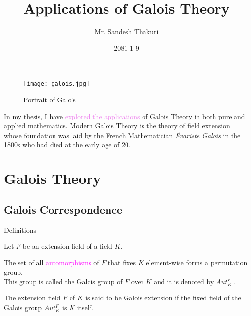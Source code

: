 \documentclass{beamer}
\title{Applications of Galois Theory}
\author[Sandesh Thakuri]{Mr. Sandesh Thakuri}
\institute[CDM, TU]
{Central Department of Mathematics, TU}
\date{2081-1-9}
\begin{document}
\myfootline

\begin{frame}[plain]
  \tikzonlytitlepage
  \titlepage
\end{frame}

\begin{frame}[plain]
\begin{figure}[h!]
  \centering
  \texttt{[image: galois.jpg]}
  \caption{\footnotesize Portrait of Galois}
\end{figure}

In my thesis, I have \textcolor{violet}{explored the applications} of Galois Theory in both pure and applied mathematics. Modern Galois Theory is the theory of field extension whose \textcolor{green!50!black}{foundation was laid by the French Mathematician \textit{Évariste Galois} in the 1800s who had died at the early age of 20.}
\end{frame}

\begin{frame}[plain]
  \begin{tcolorbox}[colframe=blue!80!violet, colback=white, boxsep=3mm,  title={ \large \bfseries Outlines}]
    \vspace{3mm}
    \tableofcontents
  \end{tcolorbox}
\end{frame}

\small
\section{Galois Theory}

\subsection{Galois Correspondence}
\begin{frame}{Definitions}

 Let \(F\) be an extension field of a field \(K\).
  \vspace{5mm}

  \begin{tcolorbox}[colframe=blue!40, colback=white, boxsep=1mm]
    \begin{definition} 
      The set of all \textcolor{magenta}{automorphisms} of \(F\) that fixes \(K\) element-wise forms a permutation group.\\[2mm]
      This group is called the Galois group of \(F\) over \(K\) and it is denoted by \(Aut_K^F\) \cite{hunger}.
    \end{definition}
    \vspace{4mm}
    \begin{definition}
      The extension field \(F\) of \(K\) is said to be Galois extension if the fixed field of the Galois group \(Aut_K^F\) is \(K\) itself.
    \end{definition}
  \end{tcolorbox}
\end{frame}
\end{document}
